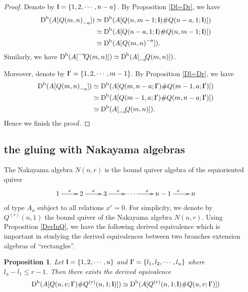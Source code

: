 \documentclass[a4paper, reqno]{amsart}
\newtheorem{prop}[thm]{Proposition}
\theoremstyle{definition}
\theoremstyle{remark}
\numberwithin{equation}{section}
\begin{document}
\begin{proof}
Denote by ${\bf{l}}=\{1,2,\cdots,n-a\}$. By Proposition \ref{Dl=Dr}, we have \begin{align*}
    \textup{D}^{\textup{b}}(A[\;{\vphantom{Q(m,n)}}\negmedspace{Q(m,n)}_{-a}])&\simeq \textup{D}^{\textup{b}}(A[Q(n,m-1;{\bf{l}})\#Q(n-a,1;{\bf{l}})])\\
    &\simeq\textup{D}^{\textup{b}}(A[Q(n-a,1;{\bf{l}})\#Q(n,m-1;{\bf{l}})])\\
    &\simeq \textup{D}^{\textup{b}}(A[\;{\vphantom{Q(m,n)}}\negmedspace{Q(m,n)}^{-a}]).
\end{align*}
Similarly, we have $\textup{D}^{\textup{b}}(A[{\vphantom{Q(m,n)}}^{-a}\negmedspace{Q(m,n)}]) \simeq \textup{D}^{\textup{b}}(A[{\vphantom{Q(m,n)}}_{-a}\negmedspace{Q(m,n)}])$. 

Moreover, denote by ${\bf{l}'}=\{1,2,\cdots,m-1\}$. By Proposition \ref{Dl=Dr}, we have \begin{align*}
    \textup{D}^{\textup{b}}(A[\;{\vphantom{Q(m,n)}}\negmedspace{Q(m,n)}_{-a}])&\simeq \textup{D}^{\textup{b}}(A[Q(m,n-a;{\bf{l}'})\#Q(m-1,a;{\bf{l}'})])\\
    &\simeq\textup{D}^{\textup{b}}(A[Q(m-1,a;{\bf{l}'})\#Q(m,n-a;{\bf{l}'})])\\
    &\simeq \textup{D}^{\textup{b}}(A[{\vphantom{Q(m,n)}}_{-a}\negmedspace{Q(m,n)}]).
\end{align*}
Hence we finish the proof.
\end{proof}

\subsection{the gluing with Nakayama algebras} 
The Nakayama algebra $N(n,r)$ is the bound quiver algebra of the equioriented quiver $$\xymatrix{1\ar[r]^{x}&2\ar[r]^{x}&3\ar[r]^{x}&\cdots\ar[r]^{x}&n-1\ar[r]^{x}&n}$$
of type $A_n$ subject to all relations $x^r=0$. For simplicity, we denote by $Q^{(r)}(n,1)$ the bound quiver of the Nakayama algebra $N(n,r)$. Using Proposition \ref{DerInQ}, we have the following derived equivalence which is important in studying the derived equivalences between two branches extension algebras of ``rectangles''.

\begin{prop} \label{prop 3.4}
Let ${\bf{l}}=\{1,2,\cdots,u\}$ and ${\bf{l}'}=\{l_1,l_2,\cdots,l_u\}$ where $l_u-l_1\leq r-1$. Then there exists the derived equivalence
$$\textup{D}^{\textup{b}}(A[Q(u,v;{\bf{l}}')\#Q^{(r)}(n,1;{\bf{l}})])
\simeq\textup{D}^{\textup{b}}
(A[Q^{(r)}(n,1;{\bf{l}})\#Q(u,v;{\bf{l}}')])$$
\end{prop}
\end{document}
